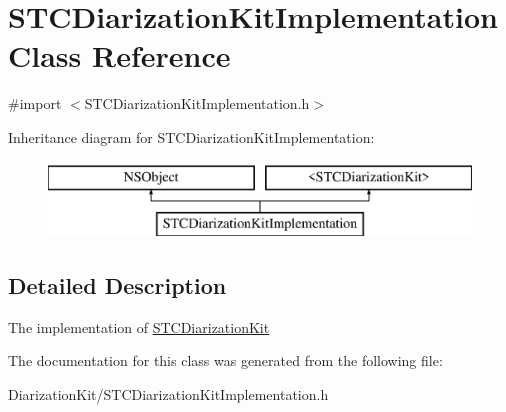 \hypertarget{interface_s_t_c_diarization_kit_implementation}{}\section{S\+T\+C\+Diarization\+Kit\+Implementation Class Reference}
\label{interface_s_t_c_diarization_kit_implementation}


{\ttfamily \#import $<$S\+T\+C\+Diarization\+Kit\+Implementation.\+h$>$}

Inheritance diagram for S\+T\+C\+Diarization\+Kit\+Implementation\+:\begin{figure}[H]
\begin{center}
\leavevmode
\includegraphics[height=2.000000cm]{interface_s_t_c_diarization_kit_implementation}
\end{center}
\end{figure}


\subsection{Detailed Description}
The implementation of \textquotesingle{}\hyperlink{class_s_t_c_diarization_kit-p}{S\+T\+C\+Diarization\+Kit}\textquotesingle{} 

The documentation for this class was generated from the following file\+:\begin{DoxyCompactItemize}
\item 
Diarization\+Kit/S\+T\+C\+Diarization\+Kit\+Implementation.\+h\end{DoxyCompactItemize}
